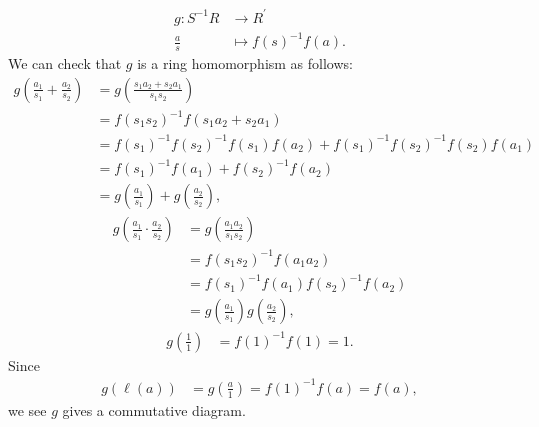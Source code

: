 \begin{solution}
\begin{itemize}
\begin{align*}
            g: S^{-1}R &\longrightarrow R^{\prime}\\
            \frac{a}{s} &\longmapsto f(s)^{-1}f(a).
        \end{align*}
        We can check that $g$ is a ring homomorphism as follows:
        \begin{align*}
           g\left(\frac{a_1}{s_1}+\frac{a_2}{s_2}\right)&=g\left(\frac{s_1a_2+s_2a_1}{s_1s_2}\right)\\
           &=f(s_1s_2)^{-1}f(s_1a_2+s_2a_1)\\
              &=f(s_1)^{-1}f(s_2)^{-1}f(s_1)f(a_2)+f(s_1)^{-1}f(s_2)^{-1}f(s_2)f(a_1)\\
           &=f(s_1)^{-1}f(a_1)+f(s_2)^{-1}f(a_2)\\
           &=g\left(\frac{a_1}{s_1}\right)+g\left(\frac{a_2}{s_2}\right),
        \end{align*}
        \begin{align*}
           g\left(\frac{a_1}{s_1}\cdot \frac{a_2}{s_2}\right)&=g\left(\frac{a_1a_2}{s_1s_2}\right)\\
              &=f(s_1s_2)^{-1}f(a_1a_2)\\
                &=f(s_1)^{-1}f(a_1)f(s_2)^{-1}f(a_2)\\
                &=g\left(\frac{a_1}{s_1}\right) g\left(\frac{a_2}{s_2}\right),
        \end{align*}
        \begin{align*}
            g\left(\frac{1}{1}\right)&=f(1)^{-1}f(1)=1.
        \end{align*}
        Since
    \begin{align*}
        g(\ell(a))&=g\left(\frac{a}{1}\right)=f(1)^{-1}f(a)=f(a),
    \end{align*}
    we see $g$ gives a commutative diagram. 
    

\end{itemize}
\end{solution}

